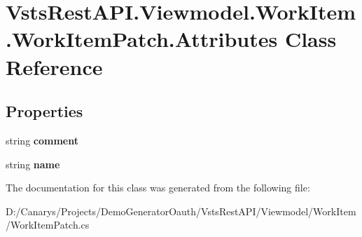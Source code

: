 \hypertarget{class_vsts_rest_a_p_i_1_1_viewmodel_1_1_work_item_1_1_work_item_patch_1_1_attributes}{}\section{Vsts\+Rest\+A\+P\+I.\+Viewmodel.\+Work\+Item.\+Work\+Item\+Patch.\+Attributes Class Reference}
\label{class_vsts_rest_a_p_i_1_1_viewmodel_1_1_work_item_1_1_work_item_patch_1_1_attributes}
\subsection*{Properties}
\begin{DoxyCompactItemize}
\item 
\mbox{\label{class_vsts_rest_a_p_i_1_1_viewmodel_1_1_work_item_1_1_work_item_patch_1_1_attributes_afb2c8090955bd7e91f69e09ee4a953f5}} 
string {\bfseries comment}
\item 
\mbox{\label{class_vsts_rest_a_p_i_1_1_viewmodel_1_1_work_item_1_1_work_item_patch_1_1_attributes_a86b398c16d9513a15e70ccef16e400d3}} 
string {\bfseries name}
\end{DoxyCompactItemize}


The documentation for this class was generated from the following file\+:\begin{DoxyCompactItemize}
\item 
D\+:/\+Canarys/\+Projects/\+Demo\+Generator\+Oauth/\+Vsts\+Rest\+A\+P\+I/\+Viewmodel/\+Work\+Item/Work\+Item\+Patch.\+cs\end{DoxyCompactItemize}
